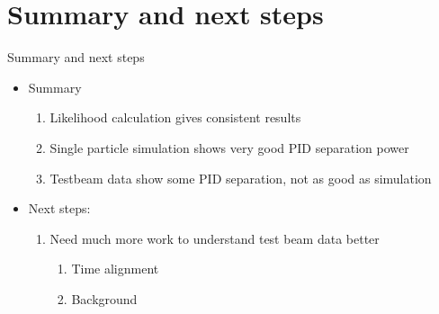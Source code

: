 \documentclass{beamer}
\begin{document}
\section{Summary and next steps}
\begin{frame}{Summary and next steps}
  \begin{itemize}
    \setlength\itemsep{2.0em}
    \item{Summary}
    \begin{enumerate}
      \setlength\itemsep{1.0em}
      \item{Likelihood calculation gives consistent results}
      \item{Single particle simulation shows very good PID separation power}
      \item{Testbeam data show some PID separation, not as good as simulation}
    \end{enumerate}
    \item{Next steps:}
    \begin{enumerate}
      \setlength\itemsep{1.0em}
      \item{Need much more work to understand test beam data better}
      \begin{enumerate}
        \item{Time alignment}
        \item{Background}
      \end{enumerate}
    \end{enumerate}
  \end{itemize}
\end{frame}
\end{document}
